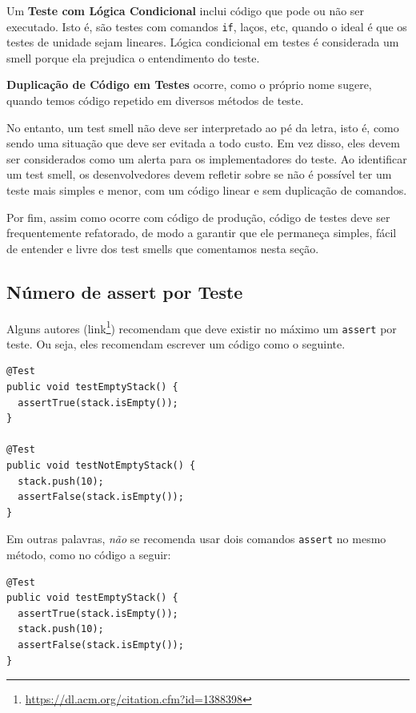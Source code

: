 \documentclass[
  11pt,
  twoside]{book}
\newcommand{\passthrough}[1]{#1}
\DeclareRobustCommand{\href}[2]{#2\footnote{\url{#1}}}
\begin{document}
Um \textbf{Teste com Lógica Condicional} inclui código que pode ou não
ser executado. Isto é, são testes com comandos
\passthrough{\lstinline!if!}, laços, etc, quando o ideal é que os testes
de unidade sejam lineares. Lógica condicional em testes é considerada um
smell porque ela prejudica o entendimento do teste.

\textbf{Duplicação de Código em Testes} ocorre, como o próprio nome
sugere, quando temos código repetido em diversos métodos de teste.

No entanto, um test smell não deve ser interpretado ao pé da letra, isto
é, como sendo uma situação que deve ser evitada a todo custo. Em vez
disso, eles devem ser considerados como um alerta para os
implementadores do teste. Ao identificar um test smell, os
desenvolvedores devem refletir sobre se não é possível ter um teste mais
simples e menor, com um código linear e sem duplicação de comandos.

Por fim, assim como ocorre com código de produção, código de testes deve
ser frequentemente refatorado, de modo a garantir que ele permaneça
simples, fácil de entender e livre dos test smells que comentamos nesta
seção.

\hypertarget{nuxfamero-de-assert-por-teste}{%
\subsection{Número de assert por
Teste}\label{nuxfamero-de-assert-por-teste}}


Alguns autores (\href{https://dl.acm.org/citation.cfm?id=1388398}{link})
recomendam que deve existir no máximo um
\passthrough{\lstinline!assert!} por teste. Ou seja, eles recomendam
escrever um código como o seguinte.

\begin{lstlisting}
@Test
public void testEmptyStack() {
  assertTrue(stack.isEmpty());
}

@Test
public void testNotEmptyStack() {
  stack.push(10);
  assertFalse(stack.isEmpty());
}
\end{lstlisting}

Em outras palavras, \emph{não} se recomenda usar dois comandos
\passthrough{\lstinline!assert!} no mesmo método, como no código a
seguir:

\begin{lstlisting}
@Test
public void testEmptyStack() {
  assertTrue(stack.isEmpty());
  stack.push(10);
  assertFalse(stack.isEmpty());
}
\end{lstlisting}
\end{document}
